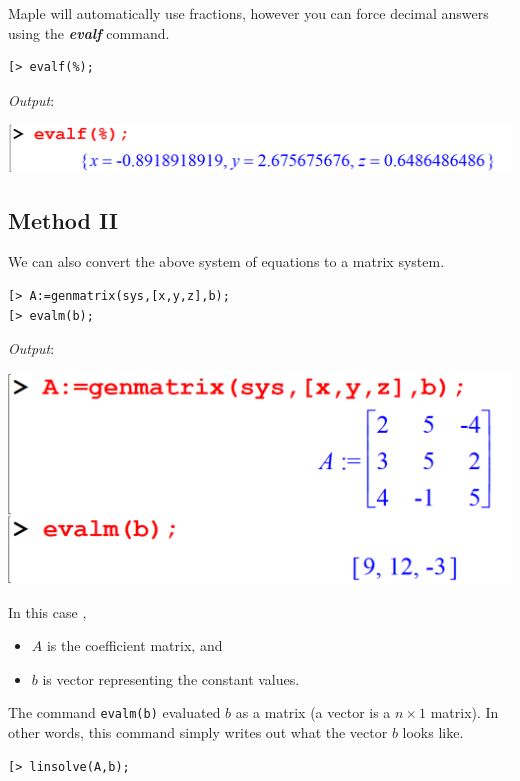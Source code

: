 \documentclass[
]{book}
\providecommand{\tightlist}{%
  \setlength{\itemsep}{0pt}\setlength{\parskip}{0pt}}
\theoremstyle{definition}
\theoremstyle{definition}
\theoremstyle{definition}
\theoremstyle{definition}
\theoremstyle{remark}
\begin{document}
Maple will automatically use fractions, however you can force decimal answers using the \textbf{\emph{evalf}} command.

\begin{verbatim}
[> evalf(%);
\end{verbatim}

\emph{Output}:

\includegraphics{figures/Lesson 5/fig5.png}

\subsection{Method II}\label{method-ii}

We can also convert the above system of equations to a matrix system.

\begin{verbatim}
[> A:=genmatrix(sys,[x,y,z],b);
[> evalm(b);
\end{verbatim}

\emph{Output}:

\includegraphics{figures/Lesson 5/fig6.png}

In this case ,

\begin{itemize}
\tightlist
\item
  \(A\) is the coefficient matrix, and
\item
  \(b\) is vector representing the constant values.
\end{itemize}

The command \texttt{evalm(b)} evaluated \(b\) as a matrix (a vector is a \(n \times 1\) matrix).
In other words, this command simply writes out what the vector \(b\) looks like.

\begin{verbatim}
[> linsolve(A,b);
\end{verbatim}
\end{document}
